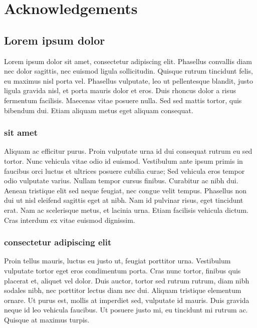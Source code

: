 \chapter*{Acknowledgements}

\section{Lorem ipsum dolor}

 Lorem ipsum dolor sit amet, consectetur adipiscing elit. Phasellus convallis diam nec dolor sagittis, nec euismod ligula sollicitudin. Quisque rutrum tincidunt felis, eu maximus nisl porta vel. Phasellus vulputate, leo ut pellentesque blandit, justo ligula gravida nisl, et porta mauris dolor et eros. Duis rhoncus dolor a risus fermentum facilisis. Maecenas vitae posuere nulla. Sed sed mattis tortor, quis bibendum dui. Etiam aliquam metus eget aliquam consequat.

\subsection{sit amet}

Aliquam ac efficitur purus. Proin vulputate urna id dui consequat rutrum eu sed tortor. Nunc vehicula vitae odio id euismod. Vestibulum ante ipsum primis in faucibus orci luctus et ultrices posuere cubilia curae; Sed vehicula eros tempor odio vulputate varius. Nullam tempor cursus finibus. Curabitur ac nibh dui. Aenean tristique elit sed neque feugiat, nec congue velit tempus. Phasellus non dui ut nisl eleifend sagittis eget at nibh. Nam id pulvinar risus, eget tincidunt erat. Nam ac scelerisque metus, et lacinia urna. Etiam facilisis vehicula dictum. Cras interdum ex vitae euismod dignissim.

\subsection{consectetur adipiscing elit}

Proin tellus mauris, luctus eu justo ut, feugiat porttitor urna. Vestibulum vulputate tortor eget eros condimentum porta. Cras nunc tortor, finibus quis placerat et, aliquet vel dolor. Duis auctor, tortor sed rutrum rutrum, diam nibh sodales nibh, nec porttitor lectus diam nec dui. Aliquam tristique elementum ornare. Ut purus est, mollis at imperdiet sed, vulputate id mauris. Duis gravida neque id leo vehicula faucibus. Ut posuere justo mi, eu tincidunt mi rutrum ac. Quisque at maximus turpis.
